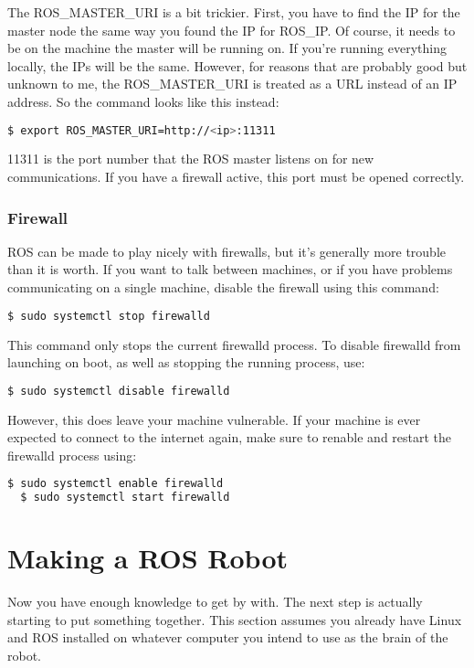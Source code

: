 The ROS\_MASTER\_URI is a bit trickier. First, you have to find the IP for the master node the same way you found the IP for ROS\_IP. Of course, it needs to be on the machine the master will be running on. If you're running everything locally, the IPs will be the same. However, for reasons that are probably good but unknown to me, the ROS\_MASTER\_URI is treated as a URL instead of an IP address. So the command looks like this instead:

\begin{lstlisting}[language=bash]
  $ export ROS_MASTER_URI=http://<ip>:11311
\end{lstlisting} 

11311 is the port number that the ROS master listens on for new communications. If you have a firewall active, this port must be opened correctly.

\subsubsection{Firewall}

ROS can be made to play nicely with firewalls, but it's generally more trouble than it is worth. If you want to talk between machines, or if you have problems communicating on a single machine, disable the firewall using this command:

\begin{lstlisting}[language=bash]
  $ sudo systemctl stop firewalld
\end{lstlisting}

This command only stops the current firewalld process. To disable firewalld from launching on boot, as well as stopping the running process, use:

\begin{lstlisting}[language=bash]
  $ sudo systemctl disable firewalld
\end{lstlisting} 

However, this does leave your machine vulnerable. If your machine is ever expected to connect to the internet again, make sure to renable and restart the firewalld process using:

\begin{lstlisting}[language=bash]
  $ sudo systemctl enable firewalld
  $ sudo systemctl start firewalld
\end{lstlisting} 

\section{Making a ROS Robot}

Now you have enough knowledge to get by with. The next step is actually starting to put something together. This section assumes you already have Linux and ROS installed on whatever computer you intend to use as the brain of the robot.




